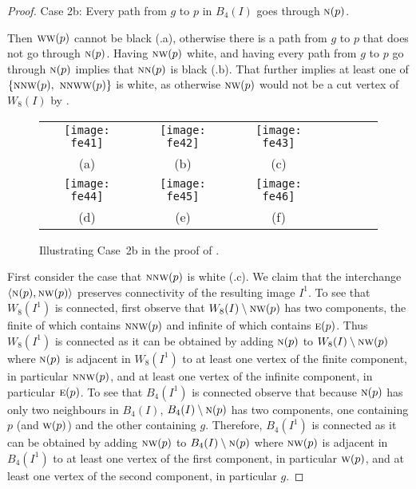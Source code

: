 \documentclass[lotsofwhite,charterfonts]{patmorin}
\newcommand{\N}{\textsc{n}}
\newcommand{\E}{\textsc{e}}
\newcommand{\W}{\textsc{w}}
\newcommand{\NW}{\textsc{nw}}
\newcommand{\ic}[2]{\langle #1,#2 \rangle}
\newcommand{\sm}{\ensuremath{\setminus}}
\begin{document}
\begin{proof}
\noindent Case 2b: Every path from $g$ to $p$ in $B_4(I)$ goes through $\N(p)$. 

Then $\W\W(p)$ cannot be black (.a), otherwise there is
 a path from $g$ to $p$ that does not go through $\N(p)$. Having $\NW(p)$
white, and having every path from $g$ to $p$ go through $\N(p)$
implies that $\N\N(p)$ is black (.b). That further implies
at least one of $\{\N\NW(p),\ \N\NW\W(p)\}$ is white, as otherwise
$\NW(p)$ would not be a cut vertex of $W_8(I)$ by . 

\begin{figure}[htbp]
\begin{center}
\begin{tabular}{ccccccc}
\texttt{[image: fe41]} &
\texttt{[image: fe42]} &
\texttt{[image: fe43]} \\
(a) & (b) & (c) \\ 
\texttt{[image: fe44]} &
\texttt{[image: fe45]} &
\texttt{[image: fe46]} \\
(d) & (e) & (f)
\end{tabular}
\end{center}
\caption{Illustrating Case~2b in the proof of .}
\end{figure}

First consider the case that $\N\NW(p)$ is white (.c). We claim that the interchange $\ic{\N(p)}{\NW(p)}$ preserves connectivity of the resulting image $I^1$. To see that $W_8(I^1)$ is connected, first observe that $W_8(I)\sm \NW(p)$ has two components, the finite of which contains $\N\NW(p)$ and infinite of which contains $\E(p)$. Thus $W_8(I^1)$ is connected as it can be obtained by adding $\N(p)$ to $W_8(I)\sm \NW(p)$ where $\N(p)$ is adjacent in $W_8(I^1)$ to at least one vertex of the finite component, in particular $\N\NW(p)$, and at least one vertex of the infinite component, in particular $\E(p)$. To see that $B_4(I^1)$ is connected observe that because $\N(p)$ has only two neighbours in $B_4(I)$, $B_4(I)\sm \N(p)$ has two components, one containing $p$ (and $\W(p)$) and the other containing $g$. Therefore, $B_4(I^1)$ is connected as it can be obtained by adding $\NW(p)$ to $B_4(I)\sm \N(p)$ where $\NW(p)$ is adjacent in $B_4(I^1)$ to at least one vertex of the first component, in particular $\W(p)$, and at least one vertex of the second component, in particular $g$.


\end{proof}
\end{document}
